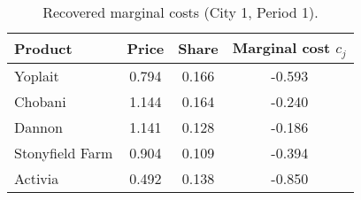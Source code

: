 \begin{table}[H]
\centering
\caption{Recovered marginal costs (City 1, Period 1).}
\label{tab:q7_mc}
\begin{tabular}{lccc}
\toprule
Product & Price & Share & Marginal cost $c_j$ \\
\midrule
Yoplait & 0.794 & 0.166 & -0.593 \\
Chobani & 1.144 & 0.164 & -0.240 \\
Dannon & 1.141 & 0.128 & -0.186 \\
Stonyfield Farm & 0.904 & 0.109 & -0.394 \\
Activia & 0.492 & 0.138 & -0.850 \\
\bottomrule
\end{tabular}
\end{table}
